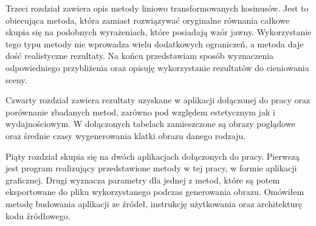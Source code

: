 \documentclass[../main.tex]{subfiles}
\begin{document}
Trzeci rozdział zawiera opis metody liniowo transformowanych kosinusów. Jest to obiecująca metoda, która zamiast rozwiązywać oryginalne równania całkowe skupia się na podobnych wyrażeniach, które posiadają wzór jawny. Wykorzystanie tego typu metody nie wprowadza wielu dodatkowych ograniczeń, a metoda daje dość realistyczne rezultaty. Na końcu przedstawiam sposób wyznaczenia odpowiedniego przybliżenia oraz opisuję wykorzystanie rezultatów do cieniowania sceny.

Czwarty rozdział zawiera rezultaty uzyskane w aplikacji dołączonej do pracy oraz porównanie zbadanych metod, zarówno pod względem estetycznym jak i wydajnościowym. W dołączonych tabelach zamieszczone są obrazy poglądowe oraz średnie czasy wygenerowania klatki obrazu danego rodzaju.

Piąty rozdział skupia się na dwóch aplikacjach dołączonych do pracy. Pierwszą jest program realizujący przedstawione metody w tej pracy, w formie aplikacji graficznej. Drugi wyznacza parametry dla jednej z metod, które są potem eksportowane do pliku wykorzystanego podczas generowania obrazu. Omówiłem metodę budowania aplikacji ze źródeł, instrukcję użytkowania oraz architekturę kodu źródłowego.
\end{document}
